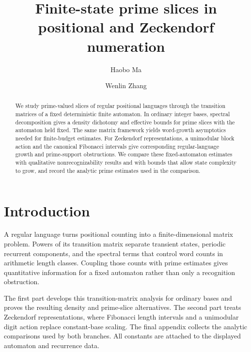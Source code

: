 \documentclass[11pt,a4paper]{amsart}
\title[Finite-state prime slices]{Finite-state prime slices in positional and Zeckendorf numeration}
\author{Haobo Ma}
\author{Wenlin Zhang}
\date{}
\begin{document}
\begin{abstract}
We study prime-valued slices of regular positional languages through the
transition matrices of a fixed deterministic finite automaton. In ordinary
integer bases, spectral decomposition gives a density dichotomy and
effective bounds for prime slices with the automaton held fixed. The same
matrix framework yields word-growth asymptotics needed for finite-budget
estimates. For Zeckendorf representations, a unimodular block action and
the canonical Fibonacci intervals give corresponding regular-language
growth and prime-support obstructions. We compare these fixed-automaton
estimates with qualitative nonrecognizability results and with bounds that
allow state complexity to grow, and record the analytic prime estimates
used in the comparison.
\end{abstract}


\maketitle

\section*{Introduction}

A regular language turns positional counting into a finite-dimensional
matrix problem. Powers of its transition matrix separate transient states,
periodic recurrent components, and the spectral terms that control word
counts in arithmetic length classes. Coupling those counts with prime
estimates gives quantitative information for a fixed automaton rather than
only a recognition obstruction.

The first part develops this transition-matrix analysis for ordinary bases
and proves the resulting density and prime-slice alternatives. The second
part treats Zeckendorf representations, where Fibonacci length intervals
and a unimodular digit action replace constant-base scaling. The final
appendix collects the analytic comparisons used by both branches. All
constants are attached to the displayed automaton and recurrence data.



\appendix



\end{document}
